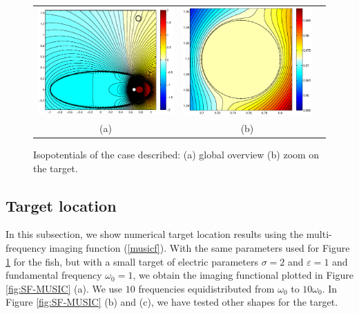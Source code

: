 \documentclass[final]{siamltex}
\numberwithin{equation}{section}
\numberwithin{figure}{section}
\numberwithin{table}{section}
\begin{document}
\begin{figure}
\centering%
\begin{tabular}{ccc}
\includegraphics[width=7.4cm]{fish_like_simul.eps} &
\includegraphics[width=7cm]{zoom_anomaly.eps}
\tabularnewline (a) & (b) \tabularnewline
\end{tabular}
\caption{\label{fig:fish_like_simul}Isopotentials of the case
described: (a) global overview (b) zoom on the target.}
\end{figure}



\subsection{Target location}

In this subsection, we show numerical target location results
using the multi-frequency imaging function (\ref{musicf}). With
the same parameters used for Figure \ref{fig:fish_like_simul} for
the fish, but with a small target of electric parameters
$\sigma=2$ and $\varepsilon=1$ and fundamental frequency $\omega_0
=1$, we obtain the imaging functional plotted in Figure
\ref{fig:SF-MUSIC} (a). We use $10$ frequencies equidistributed
from $\omega_0$ to $10 \omega_0$. In Figure \ref{fig:SF-MUSIC} (b)
and (c), we have tested other shapes for the target.

\vspace{1cm}
\end{document}
